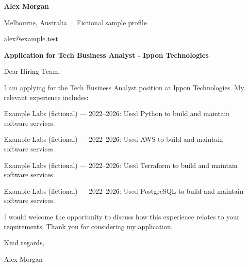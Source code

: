 \documentclass[10pt,a4paper]{article}
\begin{document}
{\LARGE\bfseries\color{navy} Alex Morgan}\par
Melbourne, Australia · Fictional sample profile\par
alex@example.test\par
{\large\bfseries\color{navy} Application for Tech Business Analyst - Ippon Technologies}\par
Dear Hiring Team,\par
I am applying for the Tech Business Analyst position at Ippon Technologies. My relevant experience includes:\par
Example Labs (fictional) — 2022–2026: Used Python to build and maintain software services.\par
Example Labs (fictional) — 2022–2026: Used AWS to build and maintain software services.\par
Example Labs (fictional) — 2022–2026: Used Terraform to build and maintain software services.\par
Example Labs (fictional) — 2022–2026: Used PostgreSQL to build and maintain software services.\par
I would welcome the opportunity to discuss how this experience relates to your requirements. Thank you for considering my application.\par
Kind regards,\par
Alex Morgan\par
\end{document}
